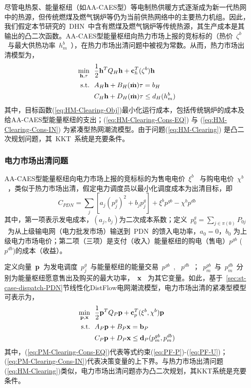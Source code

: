 尽管电热泵、能量枢纽（如AA-CAES型）等电制热供暖方式逐渐成为新一代热网中的热源\cite{4th-DHN-14}，但传统燃煤及燃气锅炉等仍为当前供热网络中的主要热力机组。因此，我们假定本节研究的~DHN~中含有燃煤及燃气锅炉等传统热源，其生产成本是其输出的凸二次函数。AA-CAES型能量枢纽向热力市场上报的竞标标的（热价~$\zeta^b$~与最大供热功率~$h_m^b$~），在热力市场出清问题中被视为常数。从而，热力市场出清模型为，
\begin{subequations}
\label{eq:HM-Clearing}
\begin{align}
\min_{{\bf h}, \tau}~~ & \frac{1}{2} {\bf h}^T Q_H {\bf h} + {\bf c}^T_h (\zeta^b) {\bf h}
\label{eq:HM-Clearing-Obj}  \\
\mbox{s.t.} ~~ &A_H{\bf h} + B_H(\dot {\bf m})\tau = b_H \label{eq:HM-Clearing-Cons-EQ}\\
       & C_H{\bf h} + D_H(\dot {\bf m})\tau \le d_H(h^b_m)
\label{eq:HM-Clearing-Cons-IN}
\end{align}
\end{subequations}
其中，目标函数(\ref{eq:HM-Clearing-Obj})最小化运行成本，包括传统锅炉的成本及给AA-CAES型能量枢纽的支出；(\ref{eq:HM-Clearing-Cons-EQ}) 与 (\ref{eq:HM-Clearing-Cons-IN}) 为紧凑型热网潮流模型。由于问题(\ref{eq:HM-Clearing}) 是凸二次规划问题，其~KKT~系统是充要条件。

\subsubsection{电力市场出清问题}
AA-CAES型能量枢纽向电力市场上报的竞标标的为售电电价~$\xi^b$~ 与购电电价~$\chi^b$~，类似于热力市场出清，假定电力调度员以最小化调度成本为出清目标，即
\begin{equation}
C_{PDN} =  \sum_j \left[ a_j (p_j^g)^2 + b_j p_j^g \right]
+ \xi^b p^{gb}  - \chi^b p^{db}
\end{equation}
其中，第一项表示发电成本，$(a_j,b_j)$为二次成本系数；定义~$p^g_0 = \sum_{j \in \pi(0)} P_{0j}$~为从上级输电网（电力批发市场）输送到~PDN~的馈入电功率，$a_0=0$，$b_0$ 为上级电力市场电价；第二项（三项）是支付（收入）能量枢纽的购电（售电）$p^{gb}$ ($p^{db}$)的成本（收益）。

定义向量~$\bf p$~为发电调度~$p^g_j$~与能量枢纽的能量交易~$p^{gb}$~, ~$p^{db}$~；~$p_m^{gb}$~与~$p_m^{db}$~分别为能量枢纽愿意售出及购买的最大功率，~$\bf x$~ 为其它变量。如此，基于~\ref{sec:st-case-dispatch-PDN}节线性化DistFlow电网潮流模型，电力市场出清的紧凑型模型可表示为，
\begin{subequations}
\label{eq:PM-Clearing}
\begin{align}
\min_{\bf p,x}~~ & \frac{1}{2} {\bf p}^T Q_P {\bf p} + {\bf c}^T_p (\xi^b,\chi^b) {\bf p}   \label{eq:PM-Clearing-Obj}  \\
\mbox{s.t.} ~~ &  A_P {\bf p} + B_P {\bf x} = {\bf b}_P
\label{eq:PM-Clearing-Cons-EQ}  \\
       & C_P {\bf p} + D_P {\bf x} \le {\bf d}_P(p^{gb}_m, p^{db}_m)
\label{eq:PM-Clearing-Cons-IN}
\end{align}
\end{subequations}
其中，(\ref{eq:PM-Clearing-Cons-EQ})代表等式约束(\ref{eq:PF-P})-(\ref{eq:PF-U})；(\ref{eq:PM-Clearing-Cons-IN})代表决策变量的上下界。与热力市场出清问题(\ref{eq:HM-Clearing})类似，电力市场出清问题亦为凸二次规划，其KKT系统是充要条件。

